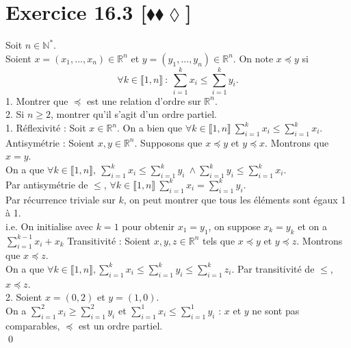 \documentclass[10pt]{article}
\begin{document}
\section*{Exercice 16.3 [$\blacklozenge\blacklozenge\lozenge$]}
\begin{tcolorbox}[enhanced, width=7.6in, center, size=fbox, fontupper=\large, drop shadow southwest]
    Soit $n\in\mathbb{N}^*$.\\
    Soient $x=(x_1,...,x_n)\in\mathbb{R}^n$ et $y=(y_1,...,y_n)\in\mathbb{R}^n$. On note $x \preceq y$ si
    \begin{equation*}
        \forall k \in \llbracket 1, n \rrbracket ~ : ~ \sum_{i=1}^kx_i \leq \sum_{i=1}^ky_i.
    \end{equation*}
    1. Montrer que $\preceq$ est une relation d'ordre sur $\mathbb{R}^n$.\\
    2. Si $n \geq 2$, montrer qu'il s'agit d'un ordre partiel.\\[0.2cm]
    1. Réflexivité : Soit $x\in\mathbb{R}^n$. On a bien que $\forall k \in \llbracket 1,n \rrbracket ~\sum_{i=1}^kx_i \leq \sum_{i=1}^kx_i$.\\[0.1cm]
    Antisymétrie : Soient $x,y\in\mathbb{R}^n$. Supposons que $x \preceq y$ et $y \preceq x$. Montrons que $x=y$.\\
    On a que $\forall k \in \llbracket 1, n \rrbracket, ~ \sum_{i=1}^kx_i \leq \sum_{i=1}^ky_i ~ \wedge \sum_{i=1}^ky_i \leq \sum_{i=1}^kx_i$.\\
    Par antisymétrie de $\leq$, $\forall k \in \llbracket 1, n \rrbracket ~ \sum_{i=1}^kx_i = \sum_{i=1}^k y_i$.\\
    Par récurrence triviale sur $k$, on peut montrer que tous les éléments sont égaux 1 à 1.\\
    i.e. On initialise avec $k=1$ pour obtenir $x_1=y_1$, on suppose $x_k = y_k$ et on a $\sum_{i=1}^{k-1}x_i + x_k  $
    Transitivité : Soient $x,y,z \in \mathbb{R}^n$ tels que $x \preceq y$ et $y \preceq z$. Montrons que $x \preceq z$.\\
    On a que $\forall k \in \llbracket 1, n \rrbracket, \sum_{i=1}^kx_i \leq \sum_{i=1}^ky_i\leq\sum_{i=1}^kz_i$. Par transitivité de $\leq$, $x \preceq z$.\\[0.2cm]
    2. Soient $x=(0,2)$ et $y=(1,0)$.\\
    On a $\sum_{i=1}^2x_i \geq \sum_{i=1}^2y_i$ et $\sum_{i=1}^1x_i \leq \sum_{i=1}^1y_i$ : $x$ et $y$ ne sont pas comparables, $\preceq$ est un ordre partiel.\\
    \qed
\end{tcolorbox}
\end{document}
